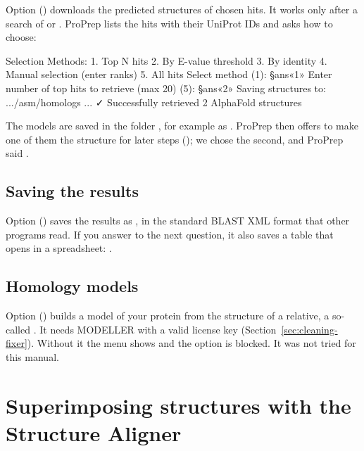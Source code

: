 Option  () downloads the
predicted structures of chosen hits. It works only after a search of
 or . ProPrep lists the hits with their UniProt
IDs and asks how to choose:
\begin{screen}
Selection Methods:
1. Top N hits
2. By E-value threshold
3. By identity %
4. Manual selection (enter ranks)
5. All hits
Select method (1): §ans«1»
Enter number of top hits to retrieve (max 20) (5): §ans«2»
Saving structures to: .../asm/homologs
...
✓ Successfully retrieved 2 AlphaFold structures
\end{screen}
The models are saved in the folder , for example as
. ProPrep then offers to make one of
them the structure for later steps
(); we
chose the second, and ProPrep said
.

\subsection{Saving the results}

Option  () saves the results
as , in the standard BLAST XML format that other
programs read. If you answer  to the next question, it also saves a
table that opens in a spreadsheet:
.

\subsection{Homology models}

\begin{needsoftware}
Option  () builds a model of
your protein from the structure of a relative, a so-called
. It needs MODELLER with a valid license key
(Section~\ref{sec:cleaning-fixer}). Without it the menu shows
 and the option is blocked. It was not tried for
this manual.
\end{needsoftware}

\section{Superimposing structures with the Structure Aligner}
\label{sec:compare-align}

